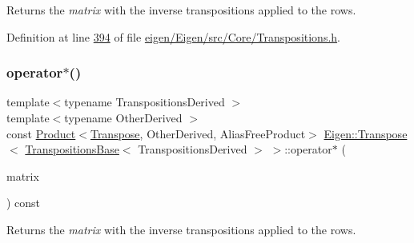 \begin{DoxyReturn}{Returns}
the {\itshape matrix} with the inverse transpositions applied to the rows. 
\end{DoxyReturn}


Definition at line \hyperlink{eigen_2_eigen_2src_2_core_2_transpositions_8h_source_l00394}{394} of file \hyperlink{eigen_2_eigen_2src_2_core_2_transpositions_8h_source}{eigen/\+Eigen/src/\+Core/\+Transpositions.\+h}.

\mbox{\label{class_eigen_1_1_transpose_3_01_transpositions_base_3_01_transpositions_derived_01_4_01_4_aa221d105a46384dde9c221bc0d6c7c43}} 
\subsubsection{\texorpdfstring{operator$\ast$()}{operator*()}\hspace{0.1cm}{\footnotesize\ttfamily [2/2]}}
{\footnotesize\ttfamily template$<$typename Transpositions\+Derived $>$ \\
template$<$typename Other\+Derived $>$ \\
const \hyperlink{group___core___module_class_eigen_1_1_product}{Product}$<$\hyperlink{group___core___module_class_eigen_1_1_transpose}{Transpose}, Other\+Derived, Alias\+Free\+Product$>$ \hyperlink{group___core___module_class_eigen_1_1_transpose}{Eigen\+::\+Transpose}$<$ \hyperlink{class_eigen_1_1_transpositions_base}{Transpositions\+Base}$<$ Transpositions\+Derived $>$ $>$\+::operator$\ast$ (\begin{DoxyParamCaption}\item[{const \hyperlink{group___core___module_class_eigen_1_1_matrix_base}{Matrix\+Base}$<$ Other\+Derived $>$ \&}]{matrix }\end{DoxyParamCaption}) const\hspace{0.3cm}{\ttfamily [inline]}}

\begin{DoxyReturn}{Returns}
the {\itshape matrix} with the inverse transpositions applied to the rows. 
\end{DoxyReturn}


